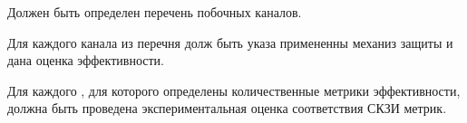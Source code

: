 
\label{R.NI.Channels} %
Должен быть определен перечень побочных каналов. 

Для каждого канала из перечня
долж быть указа примененны 
механиз защиты и дана оценка  эффективности.
                             	

\label{R.NI.Protect} %


\label{R.NI.Estimate} %
Для каждого , для которого 
определены количественные метрики эффективности, должна быть проведена 
экспериментальная оценка соответствия СКЗИ метрик.

